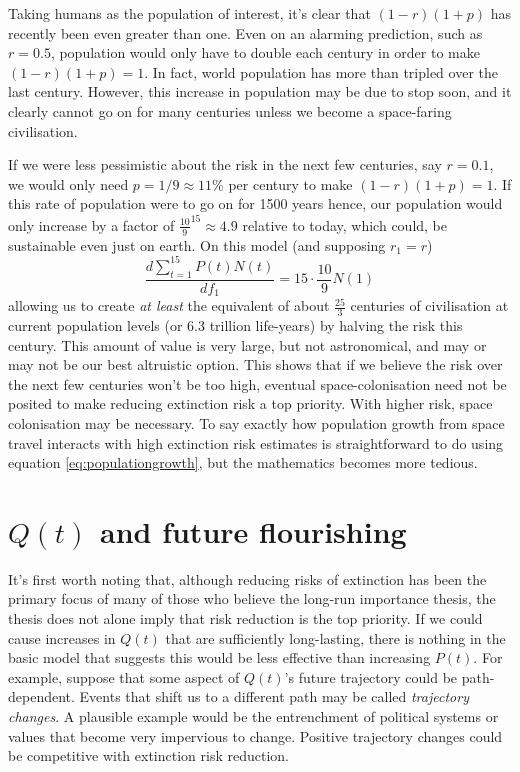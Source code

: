 \documentclass[british]{article}
\begin{document}
Taking humans as the population of interest, it's clear that $(1-r)(1+p)$ has recently been even greater than one. Even on an alarming prediction, such as $r=0.5$, population would only have to double each century in order to make $(1-r)(1+p)=1$. In fact, world population has more than tripled over the last century. However, this increase in population may be due to stop soon, and it clearly cannot go on for many centuries unless we become a space-faring civilisation.

If we were less pessimistic about the risk in the next few centuries, say $r=0.1$, we would only need $p=1/9\approx11\%$ per century to make $(1-r)(1+p)=1$. If this rate of population were to go on for 1500 years hence, our population would only increase by a factor of $\frac{10}{9}^{15} \approx 4.9$ relative to today, which could, be sustainable even just on earth. On this model (and supposing $r_1=r$)
$$\frac{d\sum_{t=1}^{15} P(t)N(t)}{df_1}=15 \cdot \frac{10}{9}N(1)$$
allowing us to create \emph{at least} the equivalent of about $\frac{25}{3}$ centuries of civilisation at current population levels (or 6.3 trillion life-years) by halving the risk this century. This amount of value is very large, but not astronomical, and may or may not be our best altruistic option. This shows that if we believe the risk over the next few centuries won't be too high, eventual space-colonisation need not be posited to make reducing extinction risk a top priority. With higher risk, space colonisation may be necessary. To say exactly how population growth from space travel interacts with high extinction risk estimates is straightforward to do using equation \ref{eq:populationgrowth}, but the mathematics becomes more tedious. 

\section{$Q(t)$ and future flourishing}\label{qt}
It's first worth noting that, although reducing risks of extinction has been the primary focus of many of those who believe the long-run importance thesis, the thesis does not alone imply that risk reduction is the top priority. If we could cause increases in $Q(t)$ that are sufficiently long-lasting, there is nothing in the basic model that suggests this would be less effective than increasing $P(t)$. For example, suppose that some aspect of $Q(t)$'s future trajectory could be path-dependent. Events that shift us to a different path may be called \emph{trajectory changes}. A plausible example would be the entrenchment of political systems or values that become very impervious to change. Positive trajectory changes could be competitive with extinction risk reduction.
\end{document}
